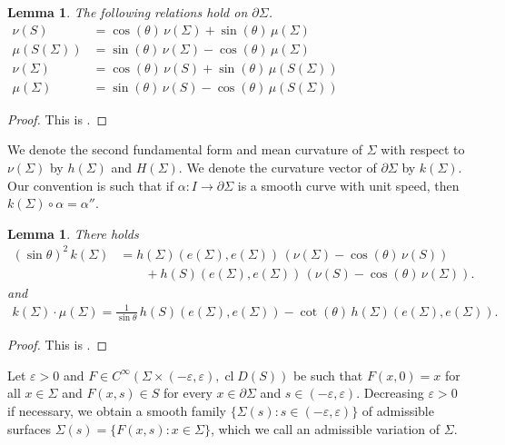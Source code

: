 \documentclass[11pt]{amsart}
\newtheorem{lem}[prop]{Lemma}
\begin{document}
\begin{appendices}
			\begin{lem}  \label{angles}
		The following relations hold on $\partial \Sigma$. 
		\begin{equation*}
			\begin{aligned} 
				\nu(S)&=\cos(\theta)\,  \nu(\Sigma)+\sin(\theta) \,\mu(\Sigma)\qquad\qquad\qquad\qquad\qquad\qquad \\
				\mu(S(\Sigma))&=\sin(\theta) \,\nu(\Sigma)-\cos(\theta) \,\mu(\Sigma)\\
				\nu(\Sigma)&=\cos(\theta)\,  \nu(S)+\sin(\theta) \,\mu(S(\Sigma))\\
				\mu(\Sigma)&=\sin(\theta) \,\nu(S)-\cos(\theta) \,\mu(S(\Sigma))
			\end{aligned}
		\end{equation*}
		\end{lem}
		\begin{proof}
			This is \cite[Lemma 41]{eichmair2024penrose}.
		\end{proof}
		We denote the second fundamental form and mean curvature of $\Sigma$ with respect to $\nu(\Sigma)$ by  $h(\Sigma)$ and $H(\Sigma)$. 	We denote the  curvature vector of $\partial \Sigma$ by	$k( \Sigma)$. Our convention is such that if $\alpha:I\to\partial \Sigma$ is a smooth curve with unit speed, then $k(\Sigma)\circ \alpha=\alpha''$.
		\begin{lem}
			There holds 
			\begin{equation} \label{curvature} 
				\begin{aligned} 
					(\sin\theta)^2\,	k( \Sigma)&=h(\Sigma)(e( \Sigma),e( \Sigma))\,\left(\nu(\Sigma)-\cos(\theta)\,\nu(S)\right)
					\\&\qquad +h(S)(e( \Sigma),e( \Sigma))\,\left(\nu(S)-\cos(\theta)\,\nu(\Sigma)\right).
				\end{aligned} 
			\end{equation}
			and
			\begin{align*} 
				k(\Sigma)\cdot\mu(\Sigma)=\frac{1}{\sin\theta}\,h(S)(e( \Sigma),e( \Sigma))-\cot(\theta)\,h(\Sigma)(e( \Sigma),e( \Sigma)).
			\end{align*}
		\end{lem}
	\begin{proof}
		This is \cite[Lemma 41]{eichmair2024penrose}.
	\end{proof}	
		Let $\varepsilon>0$ and $F\in C^\infty(\Sigma\times(-\varepsilon,\varepsilon), \operatorname{cl} D(S))$ be such that $F(x,0)=x$ for all $x\in \Sigma$ and $F(x,s)\in S$ for every $x\in \partial \Sigma$ and $s\in(-\varepsilon,\varepsilon)$.  	Decreasing $\varepsilon>0$ if necessary, we obtain a smooth family $\{\Sigma(s):s\in(-\varepsilon,\varepsilon)\}$ of admissible surfaces $\Sigma(s)=\{F(x,s):x\in \Sigma\}$, which we call an admissible variation of $\Sigma$.

\end{appendices}
\end{document}
